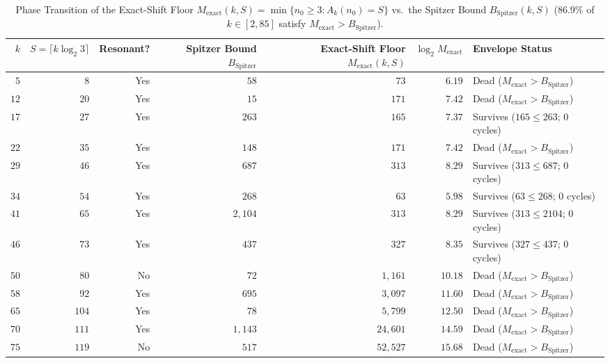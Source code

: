 \documentclass[11pt, a4paper]{amsart}
\theoremstyle{definition}
\begin{document}
\begin{table}[htbp]
\centering
\caption{Phase Transition of the Exact-Shift Floor $M_{\text{exact}}(k,S) = \min\{n_0 \ge 3 : A_k(n_0) = S\}$ vs.\ the Spitzer Bound $B_{\text{Spitzer}}(k,S)$ ($86.9\%$ of $k \in [2, 85]$ satisfy $M_{\text{exact}} > B_{\text{Spitzer}}$).}
\label{tab:phase_transition}
\footnotesize
\begin{tabular}{@{}rrrrrrl@{}}
\toprule
$k$ & $S = \lceil k \log_2 3 \rceil$ & Resonant? & Spitzer Bound $B_{\text{Spitzer}}$ & Exact-Shift Floor $M_{\text{exact}}(k,S)$ & $\log_2 M_{\text{exact}}$ & Envelope Status \\
\midrule
$5$  & $8$   & Yes & $58$    & $73$     & $6.19$  & Dead ($M_{\text{exact}} > B_{\text{Spitzer}}$) \\
$12$ & $20$  & Yes & $15$    & $171$    & $7.42$  & Dead ($M_{\text{exact}} > B_{\text{Spitzer}}$) \\
$17$ & $27$  & Yes & $263$   & $165$    & $7.37$  & Survives ($165 \le 263$; $0$ cycles) \\
$22$ & $35$  & Yes & $148$   & $171$    & $7.42$  & Dead ($M_{\text{exact}} > B_{\text{Spitzer}}$) \\
$29$ & $46$  & Yes & $687$   & $313$    & $8.29$  & Survives ($313 \le 687$; $0$ cycles) \\
$34$ & $54$  & Yes & $268$   & $63$     & $5.98$  & Survives ($63 \le 268$; $0$ cycles) \\
$41$ & $65$  & Yes & $2,104$ & $313$    & $8.29$  & Survives ($313 \le 2104$; $0$ cycles) \\
$46$ & $73$  & Yes & $437$   & $327$    & $8.35$  & Survives ($327 \le 437$; $0$ cycles) \\
$50$ & $80$  & No  & $72$    & $1,161$  & $10.18$ & Dead ($M_{\text{exact}} > B_{\text{Spitzer}}$) \\
$58$ & $92$  & Yes & $695$   & $3,097$  & $11.60$ & Dead ($M_{\text{exact}} > B_{\text{Spitzer}}$) \\
$65$ & $104$ & Yes & $78$    & $5,799$  & $12.50$ & Dead ($M_{\text{exact}} > B_{\text{Spitzer}}$) \\
$70$ & $111$ & Yes & $1,143$ & $24,601$ & $14.59$ & Dead ($M_{\text{exact}} > B_{\text{Spitzer}}$) \\
$75$ & $119$ & No  & $517$   & $52,527$ & $15.68$ & Dead ($M_{\text{exact}} > B_{\text{Spitzer}}$) \\
\bottomrule
\end{tabular}
\end{table}
\end{document}
